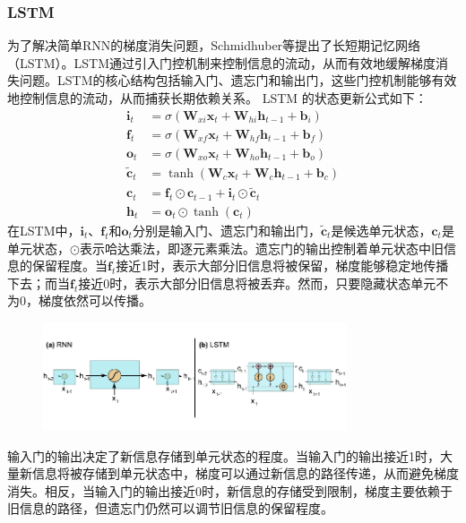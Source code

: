 \subsubsection{LSTM}
为了解决简单RNN的梯度消失问题，Schmidhuber等提出了长短期记忆网络（LSTM）\cite{schmidhuber1997long}。LSTM通过引入门控机制来控制信息的流动，从而有效地缓解梯度消失问题。LSTM的核心结构包括输入门、遗忘门和输出门，这些门控机制能够有效地控制信息的流动，从而捕获长期依赖关系。
LSTM 的状态更新公式如下：
\begin{align}
  \mathbf{i}_t         & = \sigma(\mathbf{W}_{xi} \mathbf{x}_t + \mathbf{W}_{hi} \mathbf{h}_{t-1} + \mathbf{b}_i) \\
  \mathbf{f}_t         & = \sigma(\mathbf{W}_{xf} \mathbf{x}_t + \mathbf{W}_{hf} \mathbf{h}_{t-1} + \mathbf{b}_f) \\
  \mathbf{o}_t         & = \sigma(\mathbf{W}_{xo} \mathbf{x}_t + \mathbf{W}_{ho} \mathbf{h}_{t-1} + \mathbf{b}_o) \\
  \tilde{\mathbf{c}}_t & = \tanh(\mathbf{W}_c \mathbf{x}_t + \mathbf{W}_c \mathbf{h}_{t-1} + \mathbf{b}_c)        \\
  \mathbf{c}_t         & = \mathbf{f}_t \odot \mathbf{c}_{t-1} + \mathbf{i}_t \odot  \tilde{\mathbf{c}}_t         \\
  \mathbf{h}_t         & = \mathbf{o}_t \odot \tanh(\mathbf{c}_t)
\end{align}
在LSTM中，$\mathbf{i}_t$、$\mathbf{f}_t$和$\mathbf{o}_t$分别是输入门、遗忘门和输出门，$\tilde{\mathbf{c}}_t$是候选单元状态，$\mathbf{c}_t$是单元状态，$\odot$表示哈达乘法，即逐元素乘法。遗忘门的输出控制着单元状态中旧信息的保留程度。当$\mathbf{f}_t$接近1时，表示大部分旧信息将被保留，梯度能够稳定地传播下去；而当$\mathbf{f}_t$接近0时，表示大部分旧信息将被丢弃。然而，只要隐藏状态单元不为0，梯度依然可以传播。
\begin{figure}[htbp]
  \centering
  \includegraphics[width=0.8\textwidth]{Fig/rnn_lstm.pdf}
\end{figure}
输入门的输出决定了新信息存储到单元状态的程度。当输入门的输出接近1时，大量新信息将被存储到单元状态中，梯度可以通过新信息的路径传递，从而避免梯度消失。相反，当输入门的输出接近0时，新信息的存储受到限制，梯度主要依赖于旧信息的路径，但遗忘门仍然可以调节旧信息的保留程度。

